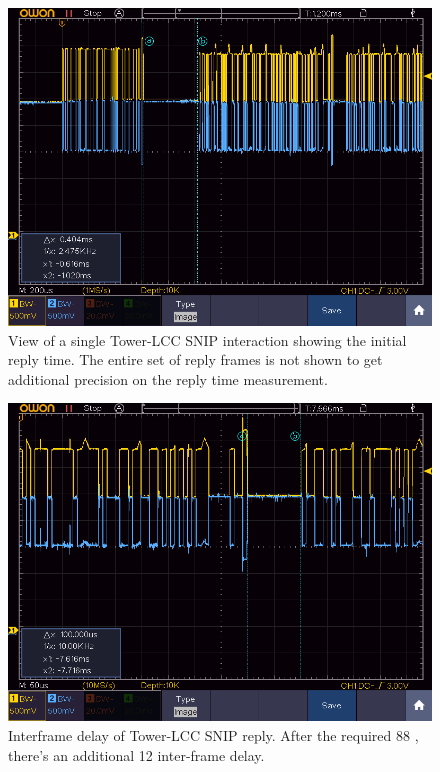 \documentclass[11pt]{article}
\begin{document}
\begin{figure}[!htbp]
\centering
\includegraphics[width=1.0\linewidth]{1SNIP_TWR_Delay}
\caption{View of a single Tower-LCC SNIP interaction
showing the initial reply time.
The entire set of reply frames is not shown to get additional
precision on the reply time measurement.}
\label{fig:single_TWR_SNIP_interaction}
\end{figure}

\begin{figure}[!htbp]
\centering
\includegraphics[width=1.0\linewidth]{1SNIP_TWR_Spacing}
\caption{Interframe delay of Tower-LCC SNIP reply.
After the required 88 \us, there's an additional 12\us 
inter-frame delay.}
\label{fig:single_TWR_SNIP_interframe}
\end{figure}
\end{document}
